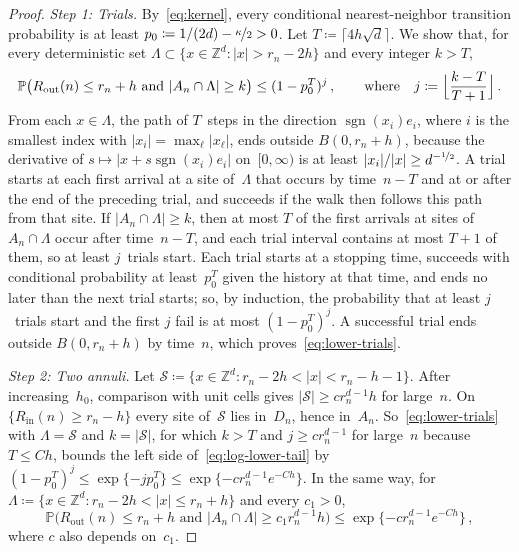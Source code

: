 \documentclass[11pt]{amsart}
\theoremstyle{plain}
\theoremstyle{definition}
\newcommand{\Z}{\mathbb Z}
\renewcommand{\P}{\mathbb P}
\newcommand{\drift}{\kappa}
\newcommand{\nf}{\nicefrac}
\newcommand{\Rin}{R_{\mathrm{in}}}
\newcommand{\Rout}{R_{\mathrm{out}}}
\numberwithin{equation}{section}
\begin{document}
\begin{proof}
\emph{Step 1: Trials.} By~\eqref{eq:kernel}, every conditional nearest-neighbor transition probability is at least $p_0\coloneqq1/(2d)-\nf\drift2>0$. Let $T\coloneqq\lceil4h\sqrt d\rceil$. We show that, for every deterministic set $\Lambda\subset\{x\in\Z^d:|x|>r_n-2h\}$ and every integer $k>T$,
\begin{equation}\label{eq:lower-trials}
\P\bigl(\Rout(n)\leq r_n+h\text{ and }|A_n\cap\Lambda|\geq k\bigr)\leq(1-p_0^T)^j\, ,\qquad\text{where}\quad j\coloneqq\Bigl\lfloor\frac{k-T}{T+1}\Bigr\rfloor\, .
\end{equation}
From each $x\in\Lambda$, the path of $T$~steps in the direction $\operatorname{sgn}(x_i)e_i$, where $i$ is the smallest index with $|x_i|=\max_\ell|x_\ell|$, ends outside $B(0,r_n+h)$, because the derivative of $s\mapsto|x+s\operatorname{sgn}(x_i)e_i|$ on~$[0,\infty)$ is at least $|x_i|/|x|\geq d^{-\nf12}$. A trial starts at each first arrival at a site of~$\Lambda$ that occurs by time~$n-T$ and at or after the end of the preceding trial, and succeeds if the walk then follows this path from that site. If $|A_n\cap\Lambda|\geq k$, then at most $T$ of the first arrivals at sites of $A_n\cap\Lambda$ occur after time~$n-T$, and each trial interval contains at most $T+1$ of them, so at least $j$~trials start. Each trial starts at a stopping time, succeeds with conditional probability at least~$p_0^T$ given the history at that time, and ends no later than the next trial starts; so, by induction, the probability that at least $j$~trials start and the first $j$ fail is at most $(1-p_0^T)^j$. A successful trial ends outside $B(0,r_n+h)$ by time~$n$, which proves~\eqref{eq:lower-trials}.

\emph{Step 2: Two annuli.} Let $\mathcal S\coloneqq\{x\in\Z^d:r_n-2h<|x|<r_n-h-1\}$. After increasing~$h_0$, comparison with unit cells gives $|\mathcal S|\geq cr_n^{d-1}h$ for large~$n$. On $\{\Rin(n)\geq r_n-h\}$ every site of~$\mathcal S$ lies in~$D_n$, hence in~$A_n$. So~\eqref{eq:lower-trials} with $\Lambda=\mathcal S$ and $k=|\mathcal S|$, for which $k>T$ and $j\geq cr_n^{d-1}$ for large~$n$ because $T\leq Ch$, bounds the left side of~\eqref{eq:log-lower-tail} by $(1-p_0^T)^j\leq\exp\{-jp_0^T\}\leq\exp\{-cr_n^{d-1}e^{-Ch}\}$. In the same way, for $\Lambda\coloneqq\{x\in\Z^d:r_n-2h<|x|\leq r_n+h\}$ and every $c_1>0$,
\begin{equation}\label{eq:outer-lower-trials}
\P\bigl(\Rout(n)\leq r_n+h\text{ and }|A_n\cap\Lambda|\geq c_1r_n^{d-1}h\bigr)\leq\exp\{-cr_n^{d-1}e^{-Ch}\}\, ,
\end{equation}
where $c$ also depends on~$c_1$.


\end{proof}
\end{document}
